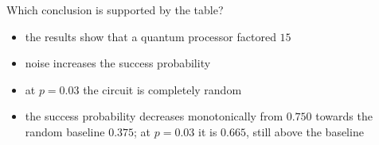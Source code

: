 \documentclass[11pt,a4paper]{article}
\newcommand{\optlabel}[1]{\textbf{(#1)}}
\newenvironment{qitem}[1]{\begin{list}{}{\setlength{\leftmargin}{3.3em}\setlength{\labelwidth}{3.1em}%
  \setlength{\labelsep}{0.2em}\setlength{\topsep}{3pt}\setlength{\parsep}{3pt}}\item[\textbf{Q.#1}\hfill]}{\end{list}}
\newcommand{\qsep}{\par\vspace{2pt}{\color{black!15}\hrule}\vspace{4pt}}
\begin{document}
\begin{qitem}{80}
Which conclusion is supported by the table?
\begin{itemize}[leftmargin=2.6em, labelsep=0.4em, itemsep=2pt, topsep=3pt]
\item[\optlabel{A}] the results show that a quantum processor factored $15$
\item[\optlabel{B}] noise increases the success probability
\item[\optlabel{C}] at $p = 0.03$ the circuit is completely random
\item[\optlabel{D}] the success probability decreases monotonically from $0.750$ towards the random baseline $0.375$; at $p = 0.03$ it is $0.665$, still above the baseline
\end{itemize}
\end{qitem}
\qsep

\newpage
\end{document}
